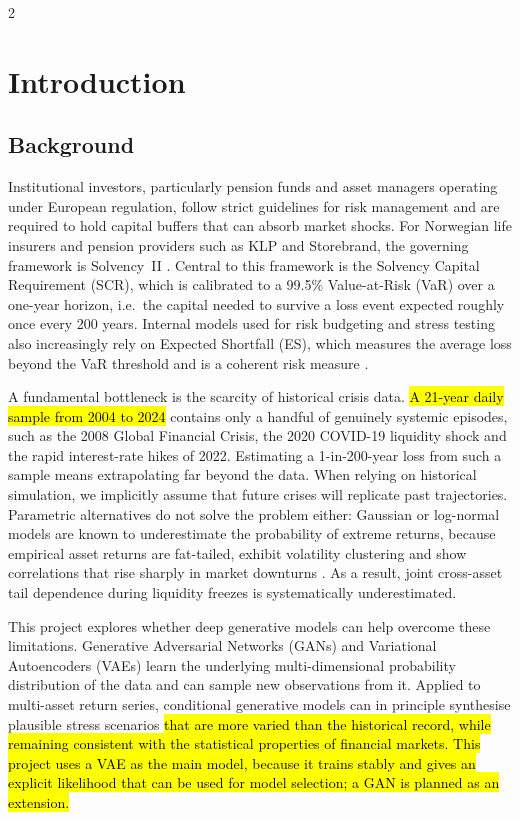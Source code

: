 \documentclass[12pt]{spieman}  %
\newcommand{\new}[1]{\hl{#1}}
\begin{document}
\begin{spacing}{2}   %

\section{Introduction}
\label{sect:intro}

\subsection{Background}
\label{sect:background}

Institutional investors, particularly pension funds and asset managers operating under European regulation, follow strict guidelines for risk management and are required to hold capital buffers that can absorb market shocks. For Norwegian life insurers and pension providers such as KLP and Storebrand, the governing framework is Solvency~II \cite{SolvencyII, Regjeringen08}. Central to this framework is the Solvency Capital Requirement (SCR), which is calibrated to a 99.5\% Value-at-Risk (VaR) over a one-year horizon, i.e.\ the capital needed to survive a loss event expected roughly once every 200 years. Internal models used for risk budgeting and stress testing also increasingly rely on Expected Shortfall (ES), which measures the average loss beyond the VaR threshold and is a coherent risk measure \cite{Artzner99}.

A fundamental bottleneck is the scarcity of historical crisis data. \new{A 21-year daily sample from 2004 to 2024} contains only a handful of genuinely systemic episodes, such as the 2008 Global Financial Crisis, the 2020 COVID-19 liquidity shock and the rapid interest-rate hikes of 2022. Estimating a 1-in-200-year loss from such a sample means extrapolating far beyond the data. When relying on historical simulation, we implicitly assume that future crises will replicate past trajectories. Parametric alternatives do not solve the problem either: Gaussian or log-normal models are known to underestimate the probability of extreme returns, because empirical asset returns are fat-tailed, exhibit volatility clustering and show correlations that rise sharply in market downturns \cite{Cont01}. As a result, joint cross-asset tail dependence during liquidity freezes is systematically underestimated.

This project explores whether deep generative models can help overcome these limitations. Generative Adversarial Networks (GANs) \cite{Goodfellow14} and Variational Autoencoders (VAEs) \cite{KingmaWelling14} learn the underlying multi-dimensional probability distribution of the data and can sample new observations from it. Applied to multi-asset return series, conditional generative models can in principle synthesise plausible stress scenarios \new{that are more varied than the historical record, while remaining consistent with the statistical properties of financial markets. This project uses a VAE as the main model, because it trains stably and gives an explicit likelihood that can be used for model selection; a GAN is planned as an extension.}


\end{spacing}
\end{document}
